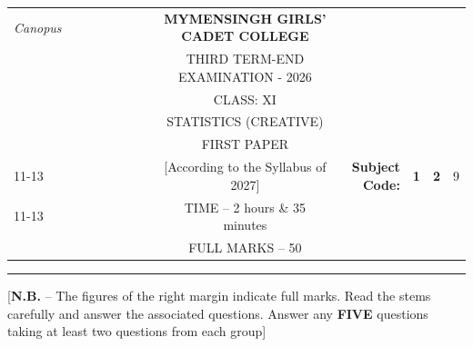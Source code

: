 \documentclass[12pt]{article}
\begin{document}
\begin{table}[]
\begin{tabular}{llllllllcllcl}
\textit{Canopus} &  &  &  &  &  &  &  & \textbf{MYMENSINGH GIRLS’ CADET COLLEGE} &                                             &                                 & \multicolumn{1}{l}{}            &                        \\
                 &  &  &  &  &  &  &  & THIRD TERM-END EXAMINATION - 2026          &                                             &                                 &                                 &                        \\
                 &  &  &  &  &  &  &  & CLASS: XI                               &                                             &                                 &                                 &                        \\
                 &  &  &  &  &  &  &  & STATISTICS (CREATIVE)                    &                                             &                                 &                                 &                        \\
                 &  &  &  &  &  &  &  & FIRST PAPER                             &                                             &                                 & \multicolumn{1}{r}{}            &                        \\ \cline{11-13} 
                 &  &  &  &  &  &  &  & [According to the Syllabus of 2027]      & \multicolumn{1}{r|}{\textbf{Subject Code:}} & \multicolumn{1}{l|}{\textbf{1}} & \multicolumn{1}{l|}{\textbf{2}} & \multicolumn{1}{l|}{9} \\ \cline{11-13} 
                 &  &  &  &  &  &  &  & TIME – 2 hours \& 35 minutes             &                                             &                                 & \multicolumn{1}{r}{}            &                        \\
                 &  &  &  &  &  &  &  & FULL MARKS – 50                          &                       
\end{tabular}
\end{table}

\vspace{-1cm}
\hrule

\begin{center}
[\textbf{N.B.} – The figures of the right margin indicate full marks. Read the stems carefully and answer the associated questions. Answer any \textbf{FIVE} questions taking at least two questions from each group]\\
\end{center}
\end{document}
